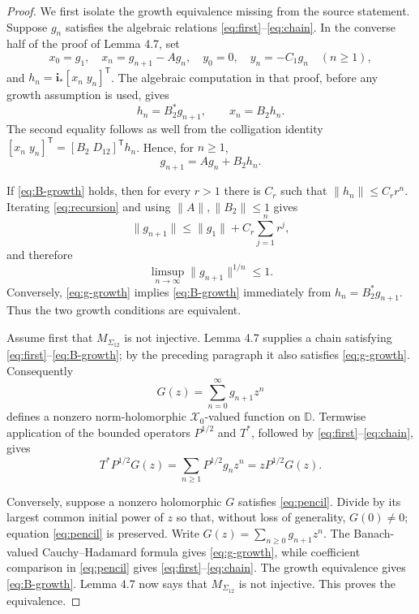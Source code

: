 \documentclass[11pt]{article}
\newcommand{\D}{\mathbb D}
\begin{document}
\begin{proof}
We first isolate the growth equivalence missing from the source statement.
Suppose $g_n$ satisfies the algebraic relations
\eqref{eq:first}--\eqref{eq:chain}.  In the converse half of the proof of
Lemma 4.7, set
\[
 x_0=g_1,\quad x_n=g_{n+1}-Ag_n,\quad
 y_0=0,\quad y_n=-C_1g_n\quad(n\geq1),
\]
and $h_n=\mathbf i_*[x_n\;y_n]^{\mathsf T}$.  The algebraic computation in
that proof, before any growth assumption is used, gives
\begin{equation}\label{eq:h-identities}
 h_n=B_2^*g_{n+1},\qquad x_n=B_2h_n.
\end{equation}
The second equality follows as well from the colligation identity
$[x_n\;y_n]^{\mathsf T}=[B_2\;D_{12}]^{\mathsf T}h_n$.  Hence, for $n\geq1$,
\begin{equation}\label{eq:recursion}
 g_{n+1}=Ag_n+B_2h_n.
\end{equation}

If \eqref{eq:B-growth} holds, then for every $r>1$ there is $C_r$ such that
$\|h_n\|\leq C_rr^n$.  Iterating \eqref{eq:recursion} and using
$\|A\|,\|B_2\|\leq1$ gives
\[
 \|g_{n+1}\|\leq\|g_1\|+C_r\sum_{j=1}^n r^j,
\]
and therefore
\begin{equation}\label{eq:g-growth}
 \limsup_{n\to\infty}\|g_{n+1}\|^{1/n}\leq1.
\end{equation}
Conversely, \eqref{eq:g-growth} implies \eqref{eq:B-growth} immediately
from $h_n=B_2^*g_{n+1}$.  Thus the two growth conditions are equivalent.

Assume first that $M_{\Sigma_{12}}$ is not injective.  Lemma 4.7 supplies
a chain satisfying \eqref{eq:first}--\eqref{eq:B-growth}; by the preceding
paragraph it also satisfies \eqref{eq:g-growth}.  Consequently
\[
 G(z)=\sum_{n=0}^{\infty}g_{n+1}z^n
\]
defines a nonzero norm-holomorphic $\mathcal X_0$-valued function on $\D$.
Termwise application of the bounded operators $P^{1/2}$ and $T^*$, followed
by \eqref{eq:first}--\eqref{eq:chain}, gives
\[
 T^*P^{1/2}G(z)
 =\sum_{n\geq1}P^{1/2}g_nz^n
 =zP^{1/2}G(z).
\]

Conversely, suppose a nonzero holomorphic $G$ satisfies
\eqref{eq:pencil}.  Divide by its largest common initial power of $z$ so
that, without loss of generality, $G(0)\neq0$; equation
\eqref{eq:pencil} is preserved.  Write
$G(z)=\sum_{n\geq0}g_{n+1}z^n$.  The Banach-valued Cauchy--Hadamard formula
gives \eqref{eq:g-growth}, while coefficient comparison in
\eqref{eq:pencil} gives \eqref{eq:first}--\eqref{eq:chain}.  The growth
equivalence gives \eqref{eq:B-growth}.  Lemma 4.7 now says that
$M_{\Sigma_{12}}$ is not injective.  This proves the equivalence.
\end{proof}
\end{document}

